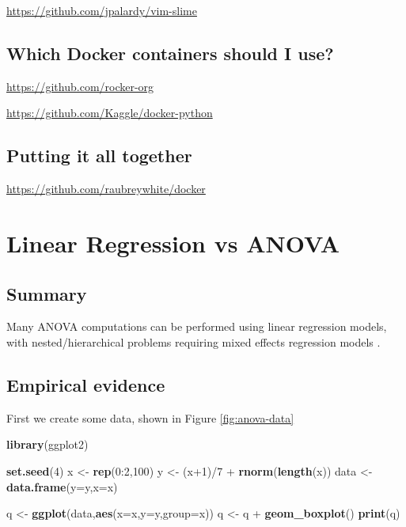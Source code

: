 \documentclass[]{book}
\newenvironment{Shaded}{\begin{snugshade}}{\end{snugshade}}
\newcommand{\KeywordTok}[1]{\textcolor[rgb]{0.13,0.29,0.53}{\textbf{{#1}}}}
\newcommand{\DataTypeTok}[1]{\textcolor[rgb]{0.13,0.29,0.53}{{#1}}}
\newcommand{\DecValTok}[1]{\textcolor[rgb]{0.00,0.00,0.81}{{#1}}}
\newcommand{\StringTok}[1]{\textcolor[rgb]{0.31,0.60,0.02}{{#1}}}
\newcommand{\NormalTok}[1]{{#1}}
\theoremstyle{definition}
\theoremstyle{definition}
\theoremstyle{remark}
\begin{document}
\url{https://github.com/jpalardy/vim-slime}

\section{Which Docker containers should I
use?}\label{which-docker-containers-should-i-use}

\url{https://github.com/rocker-org}

\url{https://github.com/Kaggle/docker-python}

\section{Putting it all together}\label{putting-it-all-together}

\url{https://github.com/raubreywhite/docker}

\chapter{Linear Regression vs ANOVA}\label{linear-regression-vs-anova}

\section{Summary}\label{summary}

Many ANOVA computations can be performed using linear regression models,
with nested/hierarchical problems requiring mixed effects regression
models \citep{gelman_analysis_2005}.

\section{Empirical evidence}\label{empirical-evidence}

First we create some data, shown in Figure \ref{fig:anova-data}

\begin{Shaded}
\begin{Highlighting}[]
\KeywordTok{library}\NormalTok{(ggplot2)}

\KeywordTok{set.seed}\NormalTok{(}\DecValTok{4}\NormalTok{)}
\NormalTok{x <-}\StringTok{ }\KeywordTok{rep}\NormalTok{(}\DecValTok{0}\NormalTok{:}\DecValTok{2}\NormalTok{,}\DecValTok{100}\NormalTok{)}
\NormalTok{y <-}\StringTok{ }\NormalTok{(x}\DecValTok{+1}\NormalTok{)/}\DecValTok{7} \NormalTok{+}\StringTok{ }\KeywordTok{rnorm}\NormalTok{(}\KeywordTok{length}\NormalTok{(x))}
\NormalTok{data <-}\StringTok{ }\KeywordTok{data.frame}\NormalTok{(}\DataTypeTok{y=}\NormalTok{y,}\DataTypeTok{x=}\NormalTok{x)}

\NormalTok{q <-}\StringTok{ }\KeywordTok{ggplot}\NormalTok{(data,}\KeywordTok{aes}\NormalTok{(}\DataTypeTok{x=}\NormalTok{x,}\DataTypeTok{y=}\NormalTok{y,}\DataTypeTok{group=}\NormalTok{x))}
\NormalTok{q <-}\StringTok{ }\NormalTok{q +}\StringTok{ }\KeywordTok{geom_boxplot}\NormalTok{()}
\KeywordTok{print}\NormalTok{(q)}
\end{Highlighting}
\end{Shaded}
\end{document}

